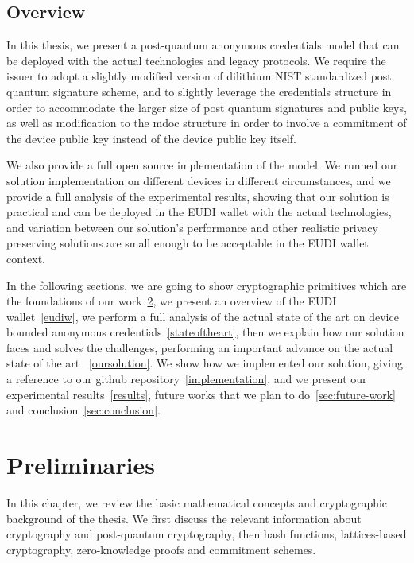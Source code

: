 \documentclass[binding=0.6cm,oneside,noexaminfo]{sapthesis}
\begin{document}
\section{Overview}
\label{overview}
In this thesis, we present a post-quantum anonymous credentials model that can be deployed with the actual technologies and legacy protocols.
We require the issuer to adopt a slightly modified version of dilithium NIST standardized post quantum signature scheme, and to slightly leverage the credentials structure in order 
to accommodate the larger size of post quantum signatures and public keys, as well as modification to the mdoc structure in order to involve a commitment
of the device public key instead of the device public key itself. 

We also provide a full open source implementation of the model. We runned our solution
implementation on different devices in different circumstances, and we provide a full 
analysis of the experimental results, showing that our solution is practical and can be 
deployed in the EUDI wallet with the actual technologies, and variation between our 
solution's performance and other realistic privacy preserving solutions are small enough 
to be acceptable in the EUDI wallet context.

In the following sections, we are going to show cryptographic primitives which are the foundations of our work~\ref{preliminaries}, we present an overview of the EUDI wallet~\ref{eudiw}, 
we perform a full analysis of the actual state of the art on device bounded anonymous 
credentials~\ref{stateoftheart}, then we explain how our solution faces and solves the challenges, performing an important advance on the actual state of the art ~\ref{oursolution}.
We show how we implemented our solution, giving a reference to our github repository~\ref{implementation}, and we present our experimental results~\ref{results}, future works that we plan to 
do~\ref{sec:future-work} and conclusion~\ref{sec:conclusion}.

\chapter{Preliminaries}
\label{preliminaries}
In this chapter, we review the basic mathematical concepts and cryptographic 
background of the thesis. We first discuss the relevant information about cryptography
and post-quantum cryptography, then hash functions, 
lattices-based cryptography, zero-knowledge proofs and commitment schemes.
\end{document}
